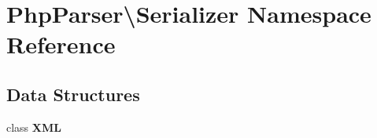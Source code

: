 \section{Php\+Parser\textbackslash{}Serializer Namespace Reference}
\label{namespace_php_parser_1_1_serializer}
\subsection*{Data Structures}
\begin{DoxyCompactItemize}
\item 
class {\bf X\+M\+L}
\end{DoxyCompactItemize}
